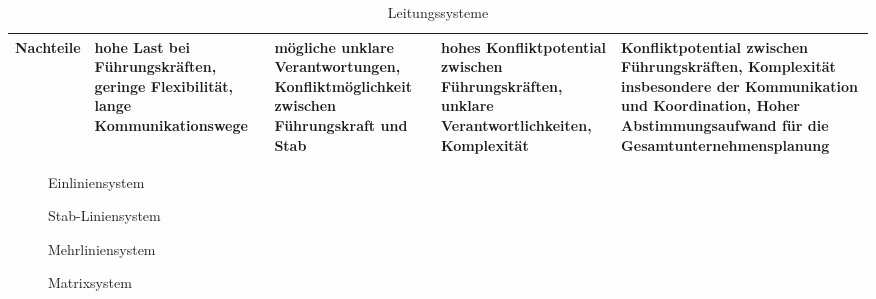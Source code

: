 \begin{table}[H]
\begin{tabularx}{\textwidth}{|>{\raggedright\arraybackslash}l|>{\raggedright\arraybackslash}X|>{\raggedright\arraybackslash}X|>{\raggedright\arraybackslash}X|>{\raggedright\arraybackslash}X|}
        \hline
        Nachteile  & hohe Last bei Führungskräften, geringe Flexibilität, lange Kommunikationswege                                                                            & mögliche unklare Verantwortungen, Konfliktmöglichkeit zwischen Führungskraft und Stab                                             & hohes Konfliktpotential zwischen Führungskräften, unklare Verantwortlichkeiten, Komplexität                                                                                                                                                               & Konfliktpotential zwischen Führungskräften, Komplexität insbesondere der Kommunikation und Koordination, Hoher Abstimmungsaufwand für die Gesamtunternehmensplanung                                                                                                 \\
        \hline
    \end{tabularx}
    \caption{Leitungssysteme}
    \label{tab:leitungssysteme}
\end{table}


\begin{figure}[H]
    \centering
    
    \caption{Einliniensystem}
    \label{fig:einliniensystem}
\end{figure}
\FloatBarrier

\begin{figure}[H]
    \centering
    
    \caption{Stab-Liniensystem}
    \label{fig:stabliniensystem}
\end{figure}
\FloatBarrier

\begin{figure}[H]
    \centering
    
    \caption{Mehrliniensystem}
    \label{fig:mehrliniensystem}
\end{figure}
\FloatBarrier

\begin{figure}[H]
    \centering
    
    \caption{Matrixsystem}
    \label{fig:matrixsystem}
\end{figure}
\FloatBarrier